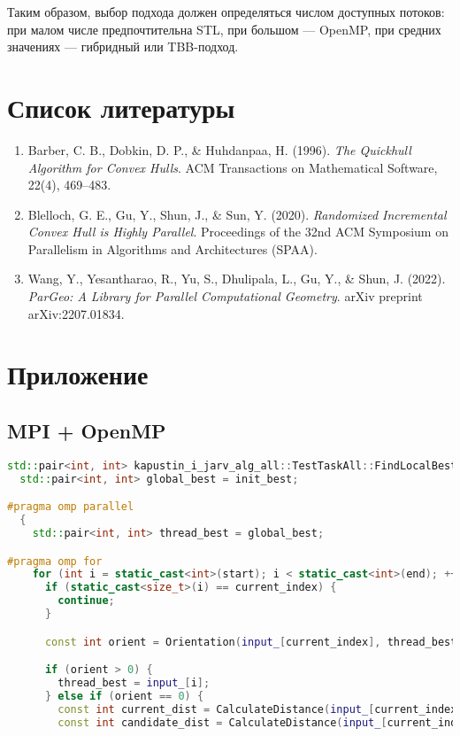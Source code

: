 \documentclass[a4paper,12pt]{article}
\begin{document}
\begin{itemize}
Таким образом, выбор подхода должен определяться числом доступных потоков: при малом числе предпочтительна STL, при большом — OpenMP, при средних значениях — гибридный или TBB-подход.
\newpage
\section{Список литературы}

\begin{enumerate}
    \item Barber, C. B., Dobkin, D. P., \& Huhdanpaa, H. (1996). \textit{The Quickhull Algorithm for Convex Hulls}. ACM Transactions on Mathematical Software, 22(4), 469–483.

    \item Blelloch, G. E., Gu, Y., Shun, J., \& Sun, Y. (2020). \textit{Randomized Incremental Convex Hull is Highly Parallel}. Proceedings of the 32nd ACM Symposium on Parallelism in Algorithms and Architectures (SPAA). 

    \item Wang, Y., Yesantharao, R., Yu, S., Dhulipala, L., Gu, Y., \& Shun, J. (2022). \textit{ParGeo: A Library for Parallel Computational Geometry}. arXiv preprint arXiv:2207.01834.
\end{enumerate}

\newpage
\section{Приложение}

\subsection*{MPI + OpenMP}
\begin{lstlisting}[language=C++]
std::pair<int, int> kapustin_i_jarv_alg_all::TestTaskAll::FindLocalBestOMP(size_t start, size_t end, size_t current_index,const std::pair<int, int>& init_best) {
  std::pair<int, int> global_best = init_best;

#pragma omp parallel
  {
    std::pair<int, int> thread_best = global_best;

#pragma omp for
    for (int i = static_cast<int>(start); i < static_cast<int>(end); ++i) {
      if (static_cast<size_t>(i) == current_index) {
        continue;
      }

      const int orient = Orientation(input_[current_index], thread_best, input_[i]);

      if (orient > 0) {
        thread_best = input_[i];
      } else if (orient == 0) {
        const int current_dist = CalculateDistance(input_[current_index], thread_best);
        const int candidate_dist = CalculateDistance(input_[current_index], input_[i]);


\end{lstlisting}
\end{itemize}
\end{document}
